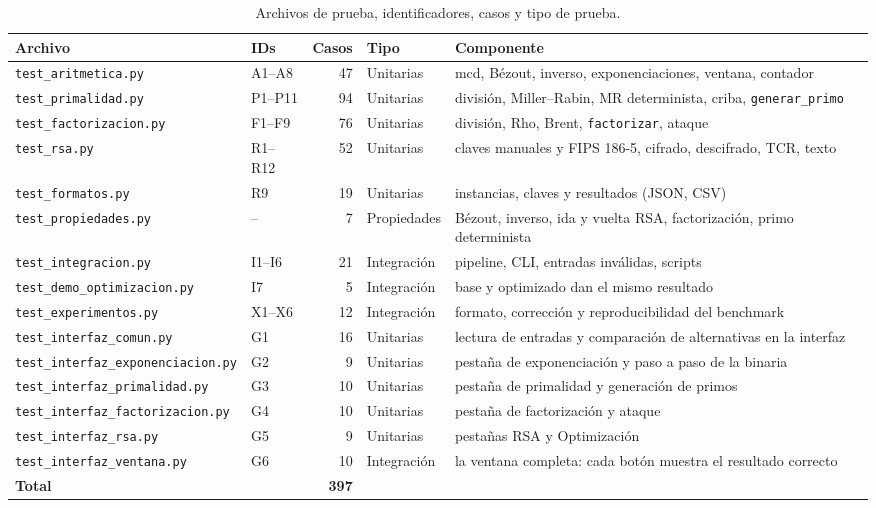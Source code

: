 \begin{table}[H]
\centering\small
\caption{Archivos de prueba, identificadores, casos y tipo de prueba.}
\label{tab:archivos-prueba}
\begin{tabularx}{\linewidth}{@{}l l r R{2.3cm} Y@{}}
\toprule
\textbf{Archivo} & \textbf{IDs} & \textbf{Casos} & \textbf{Tipo} & \textbf{Componente}\\
\midrule
\texttt{test\_aritmetica.py} & A1--A8 & 47 & Unitarias & mcd, Bézout, inverso, exponenciaciones, ventana, contador\\
\texttt{test\_primalidad.py} & P1--P11 & 94 & Unitarias & división, Miller--Rabin, MR determinista, criba, \texttt{generar\_primo}\\
\texttt{test\_factorizacion.py} & F1--F9 & 76 & Unitarias & división, Rho, Brent, \texttt{factorizar}, ataque\\
\texttt{test\_rsa.py} & R1--R12 & 52 & Unitarias & claves manuales y FIPS 186-5, cifrado, descifrado, TCR, texto\\
\texttt{test\_formatos.py} & R9 & 19 & Unitarias & instancias, claves y resultados (JSON, CSV)\\
\texttt{test\_propiedades.py} & -- & 7 & Propiedades & Bézout, inverso, ida y vuelta RSA, factorización, primo determinista\\
\texttt{test\_integracion.py} & I1--I6 & 21 & Integración & pipeline, CLI, entradas inválidas, scripts\\
\texttt{test\_demo\_optimizacion.py} & I7 & 5 & Integración & base y optimizado dan el mismo resultado\\
\texttt{test\_experimentos.py} & X1--X6 & 12 & Integración & formato, corrección y reproducibilidad del benchmark\\
\texttt{test\_interfaz\_comun.py} & G1 & 16 & Unitarias & lectura de entradas y comparación de alternativas en la interfaz\\
\texttt{test\_interfaz\_exponenciacion.py} & G2 & 9 & Unitarias & pestaña de exponenciación y paso a paso de la binaria\\
\texttt{test\_interfaz\_primalidad.py} & G3 & 10 & Unitarias & pestaña de primalidad y generación de primos\\
\texttt{test\_interfaz\_factorizacion.py} & G4 & 10 & Unitarias & pestaña de factorización y ataque\\
\texttt{test\_interfaz\_rsa.py} & G5 & 9 & Unitarias & pestañas RSA y Optimización\\
\texttt{test\_interfaz\_ventana.py} & G6 & 10 & Integración & la ventana completa: cada botón muestra el resultado correcto\\
\midrule
\textbf{Total} & & \textbf{397} & & \\
\bottomrule
\end{tabularx}
\end{table}

